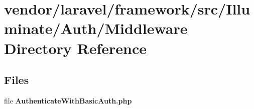 \section{vendor/laravel/framework/src/\+Illuminate/\+Auth/\+Middleware Directory Reference}
\label{dir_b4f7e377a594e7037bd8678e74073c64}
\subsection*{Files}
\begin{DoxyCompactItemize}
\item 
file {\bf Authenticate\+With\+Basic\+Auth.\+php}
\end{DoxyCompactItemize}
